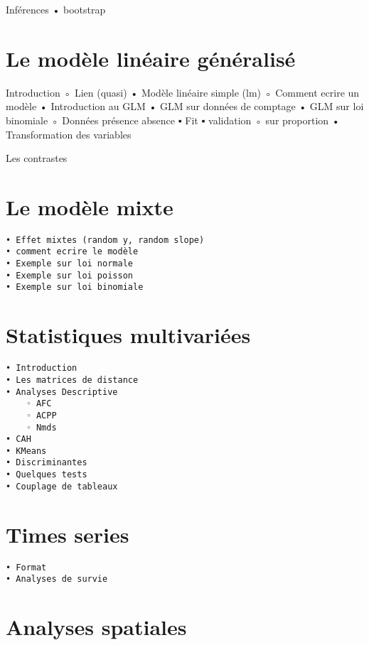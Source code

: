 \documentclass[
]{book}
\begin{document}
Inférences
• bootstrap

\hypertarget{le-moduxe8le-linuxe9aire-guxe9nuxe9ralisuxe9}{%
\chapter{Le modèle linéaire généralisé}\label{le-moduxe8le-linuxe9aire-guxe9nuxe9ralisuxe9}}

Introduction
◦ Lien (quasi)
• Modèle linéaire simple (lm)
◦ Comment ecrire un modèle
• Introduction au GLM
• GLM sur données de comptage
• GLM sur loi binomiale
◦ Données présence absence
▪ Fit
▪ validation
◦ sur proportion
• Transformation des variables

Les contrastes

\hypertarget{le-moduxe8le-mixte}{%
\chapter{Le modèle mixte}\label{le-moduxe8le-mixte}}

\begin{verbatim}
• Effet mixtes (random y, random slope)
• comment ecrire le modèle
• Exemple sur loi normale
• Exemple sur loi poisson
• Exemple sur loi binomiale
\end{verbatim}

\hypertarget{statistiques-multivariuxe9es}{%
\chapter{Statistiques multivariées}\label{statistiques-multivariuxe9es}}

\begin{verbatim}
• Introduction
• Les matrices de distance
• Analyses Descriptive
    ◦ AFC 
    ◦ ACPP
    ◦ Nmds
• CAH
• KMeans
• Discriminantes
• Quelques tests
• Couplage de tableaux
\end{verbatim}

\hypertarget{times-series}{%
\chapter{Times series}\label{times-series}}

\begin{verbatim}
• Format
• Analyses de survie
\end{verbatim}

\hypertarget{analyses-spatiales}{%
\chapter{Analyses spatiales}\label{analyses-spatiales}}
\end{document}
